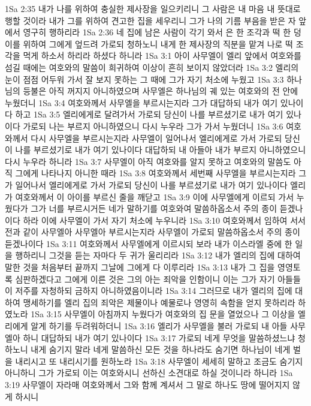 1Sa 2:35  내가 나를 위하여 충실한 제사장을 일으키리니 그 사람은 내 마음 내 뜻대로 행할 것이라 내가 그를 위하여 견고한 집을 세우리니 그가 나의 기름 부음을 받은 자 앞에서 영구히 행하리라
1Sa 2:36  네 집에 남은 사람이 각기 와서 은 한 조각과 떡 한 덩이를 위하여 그에게 엎드려 가로되 청하노니 내게 한 제사장의 직분을 맡겨 나로 떡 조각을 먹게 하소서 하리라 하셨다 하니라
1Sa 3:1  아이 사무엘이 엘리 앞에서 여호와를 섬길 때에는 여호와의 말씀이 희귀하여 이상이 흔히 보이지 않았더라
1Sa 3:2  엘리의 눈이 점점 어두워 가서 잘 보지 못하는 그 때에 그가 자기 처소에 누웠고
1Sa 3:3  하나님의 등불은 아직 꺼지지 아니하였으며 사무엘은 하나님의 궤 있는 여호와의 전 안에 누웠더니
1Sa 3:4  여호와께서 사무엘을 부르시는지라 그가 대답하되 내가 여기 있나이다 하고
1Sa 3:5  엘리에게로 달려가서 가로되 당신이 나를 부르셨기로 내가 여기 있나이다 가로되 나는 부르지 아니하였으니 다시 누우라 그가 가서 누웠더니
1Sa 3:6  여호와께서 다시 사무엘을 부르시는지라 사무엘이 일어나서 엘리에게로 가서 가로되 당신이 나를 부르셨기로 내가 여기 있나이다 대답하되 내 아들아 내가 부르지 아니하였으니 다시 누우라 하니라
1Sa 3:7  사무엘이 아직 여호와를 알지 못하고 여호와의 말씀도 아직 그에게 나타나지 아니한 때라
1Sa 3:8  여호와께서 세번째 사무엘을 부르시는지라 그가 일어나서 엘리에게로 가서 가로되 당신이 나를 부르셨기로 내가 여기 있나이다 엘리가 여호와께서 이 아이를 부르신 줄을 깨닫고
1Sa 3:9  이에 사무엘에게 이르되 가서 누웠다가 그가 너를 부르시거든 네가 말하기를 여호와여 말씀하옵소서 주의 종이 듣겠나이다 하라 이에 사무엘이 가서 자기 처소에 누우니라
1Sa 3:10  여호와께서 임하여 서서 전과 같이 사무엘아 사무엘아 부르시는지라 사무엘이 가로되 말씀하옵소서 주의 종이 듣겠나이다
1Sa 3:11  여호와께서 사무엘에게 이르시되 보라 내가 이스라엘 중에 한 일을 행하리니 그것을 듣는 자마다 두 귀가 울리리라
1Sa 3:12  내가 엘리의 집에 대하여 말한 것을 처음부터 끝까지 그날에 그에게 다 이루리라
1Sa 3:13  내가 그 집을 영영토록 심판하겠다고 그에게 이른 것은 그의 아는 죄악을 인함이니 이는 그가 자기 아들들이 저주를 자청하되 금하지 아니하였음이니라
1Sa 3:14  그러므로 내가 엘리의 집에 대하여 맹세하기를 엘리 집의 죄악은 제물이나 예물로나 영영히 속함을 얻지 못하리라 하였노라
1Sa 3:15  사무엘이 아침까지 누웠다가 여호와의 집 문을 열었으나 그 이상을 엘리에게 알게 하기를 두려워하더니
1Sa 3:16  엘리가 사무엘을 불러 가로되 내 아들 사무엘아 하니 대답하되 내가 여기 있나이다
1Sa 3:17  가로되 네게 무엇을 말씀하셨느냐 청하노니 내게 숨기지 말라 네게 말씀하신 모든 것을 하나라도 숨기면 하나님이 네게 벌을 내리시고 또 내리시기를 원하노라
1Sa 3:18  사무엘이 세세히 말하고 조금도 숨기지 아니하니 그가 가로되 이는 여호와시니 선하신 소견대로 하실 것이니라 하니라
1Sa 3:19  사무엘이 자라매 여호와께서 그와 함께 계셔서 그 말로 하나도 땅에 떨어지지 않게 하시니
